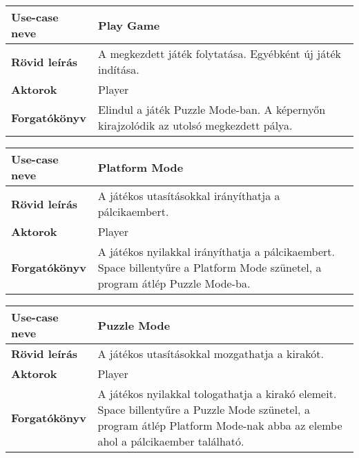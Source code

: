 \begin{center}
\begin{tabular}{|l|p{320pt}|}
\hline 
\textbf{Use-case neve} & Play Game \\ 
\hline \hline
\textbf{Rövid leírás} & A megkezdett játék folytatása. Egyébként új játék indítása. \\ 
\hline 
\textbf{Aktorok} & Player \\ 
\hline 
\textbf{Forgatókönyv} & Elindul a játék Puzzle Mode-ban. A képernyőn kirajzolódik az utolsó megkezdett pálya. \\ 
\hline
\end{tabular}
\end{center}

\begin{center}
\begin{tabular}{|l|p{320pt}|}
\hline 
\textbf{Use-case neve} & Platform Mode \\ 
\hline \hline
\textbf{Rövid leírás} & A játékos utasításokkal irányíthatja a pálcikaembert. \\ 
\hline 
\textbf{Aktorok} & Player \\ 
\hline 
\textbf{Forgatókönyv} & A játékos nyilakkal irányíthatja a pálcikaembert. Space billentyűre a Platform Mode szünetel, a program átlép Puzzle Mode-ba. \\ 
\hline
\end{tabular}
\end{center}

\begin{center}
\begin{tabular}{|l|p{320pt}|}
\hline 
\textbf{Use-case neve} & Puzzle Mode \\ 
\hline \hline
\textbf{Rövid leírás} & A játékos utasításokkal mozgathatja a kirakót. \\ 
\hline 
\textbf{Aktorok} & Player \\ 
\hline 
\textbf{Forgatókönyv} & A játékos nyilakkal tologathatja a kirakó elemeit. Space billentyűre a Puzzle Mode szünetel, a program átlép Platform Mode-nak abba az elembe ahol a pálcikaember található. \\ 
\hline
\end{tabular}
\end{center}


